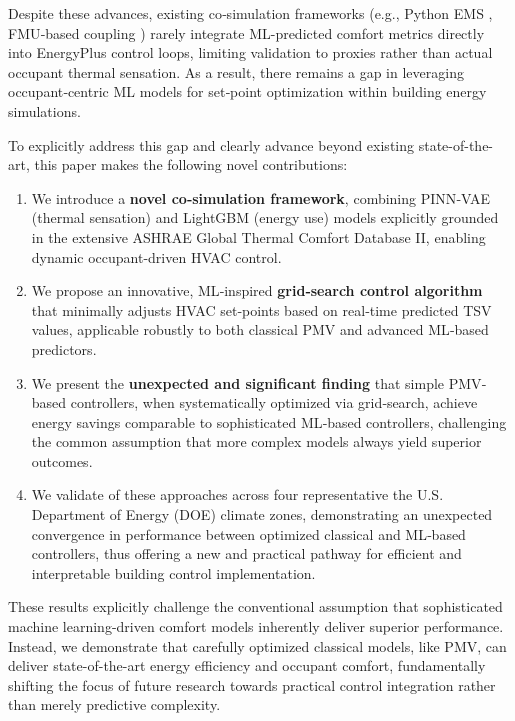 Despite these advances, existing co‐simulation frameworks (e.g., Python EMS \cite{turn1search8}, FMU‐based coupling \cite{turn1search9}) rarely integrate ML-predicted comfort metrics directly into EnergyPlus control loops, limiting validation to proxies rather than actual occupant thermal sensation.  As a result, there remains a gap in leveraging occupant‐centric ML models for set‐point optimization within building energy simulations.  

To explicitly address this gap and clearly advance beyond existing state-of-the-art, this paper makes the following novel contributions: 
\begin{enumerate}
  \item We introduce a \textbf{novel co‐simulation framework}, combining PINN‐VAE (thermal sensation) and LightGBM (energy use) models explicitly grounded in the extensive ASHRAE Global Thermal Comfort Database II, enabling dynamic occupant-driven HVAC control.
  
  \item We propose an innovative, ML‐inspired \textbf{grid‐search control algorithm} that minimally adjusts HVAC set‐points based on real‐time predicted TSV values, applicable robustly to both classical PMV and advanced ML‐based predictors.
  
  \item We present the \textbf{unexpected and significant finding} that simple PMV‐based controllers, when systematically optimized via grid‐search, achieve energy savings comparable to sophisticated ML‐based controllers, challenging the common assumption that more complex models always yield superior outcomes.
  
  \item We validate of these approaches across four representative the U.S. Department of Energy (DOE) climate zones, demonstrating an unexpected convergence in performance between optimized classical and ML‐based controllers, thus offering a new and practical pathway for efficient and interpretable building control implementation.
\end{enumerate}



These results explicitly challenge the conventional assumption that sophisticated machine learning-driven comfort models inherently deliver superior performance. Instead, we demonstrate that carefully optimized classical models, like PMV, can deliver state-of-the-art energy efficiency and occupant comfort, fundamentally shifting the focus of future research towards practical control integration rather than merely predictive complexity.